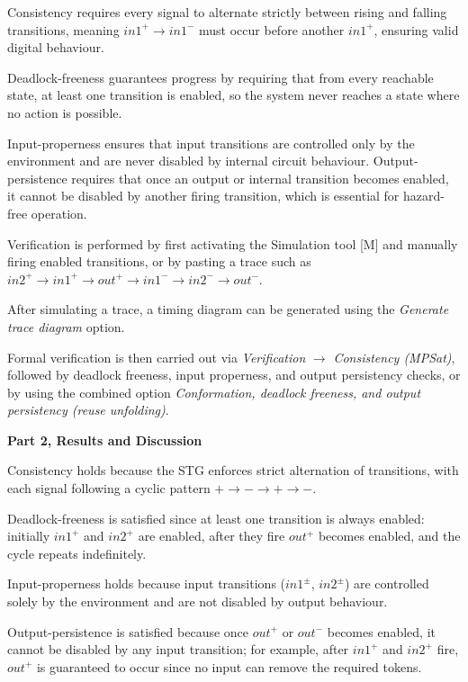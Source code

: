 \documentclass[a4paper,12pt]{article}
\begin{document}
Consistency requires every signal to alternate strictly between rising and falling transitions, meaning $in1^+ \rightarrow in1^-$ must occur before another $in1^+$, ensuring valid digital behaviour. 

Deadlock-freeness guarantees progress by requiring that from every reachable state, at least one transition is enabled, so the system never reaches a state where no action is possible. 

Input-properness ensures that input transitions are controlled only by the environment and are never disabled by internal circuit behaviour. Output-persistence requires that once an output or internal transition becomes enabled, it cannot be disabled by another firing transition, which is essential for hazard-free operation.

Verification is performed by first activating the Simulation tool [M] and manually firing enabled transitions, or by pasting a trace such as $in2^+ \rightarrow in1^+ \rightarrow out^+ \rightarrow in1^- \rightarrow in2^- \rightarrow out^-$. 

After simulating a trace, a timing diagram can be generated using the \textit{Generate trace diagram} option. 

Formal verification is then carried out via \textit{Verification} $\rightarrow$ \textit{Consistency (MPSat)}, followed by deadlock freeness, input properness, and output persistency checks, or by using the combined option \textit{Conformation, deadlock freeness, and output persistency (reuse unfolding)}.

\textbf{Part 2, Results and Discussion}

Consistency holds because the STG enforces strict alternation of transitions, with each signal following a cyclic pattern $+ \rightarrow - \rightarrow + \rightarrow -$. 

Deadlock-freeness is satisfied since at least one transition is always enabled: initially $in1^+$ and $in2^+$ are enabled, after they fire $out^+$ becomes enabled, and the cycle repeats indefinitely. 

Input-properness holds because input transitions ($in1^\pm$, $in2^\pm$) are controlled solely by the environment and are not disabled by output behaviour. 

Output-persistence is satisfied because once $out^+$ or $out^-$ becomes enabled, it cannot be disabled by any input transition; for example, after $in1^+$ and $in2^+$ fire, $out^+$ is guaranteed to occur since no input can remove the required tokens.
\end{document}
